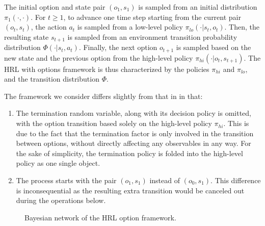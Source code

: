 The initial option and state pair $(o_1, s_1)$ is sampled from an initial distribution $\pi_1( \cdot, \cdot )$.
For $t \geq 1$, to advance one time step starting from the current pair $(o_t, s_t)$, the action $a_t$ is sampled from a low-level policy $\pi_{lo}(\cdot\vert s_t,o_t)$.
Then, the resulting state $s_{t+1}$ is sampled from an environment transition probability distribution $\Phi(\cdot\vert s_t,a_t)$.
Finally, the next option $o_{t+1}$ is sampled based on the new state and the previous option from the high-level policy $\pi_{hi}(\cdot\vert o_t,s_{t+1})$.
The HRL with options framework is thus characterized by the policies $\pi_{hi}$ and $\pi_{lo}$, and the transition distribution $\Phi$.

\begin{remark}
The framework we consider differs slightly from that in \cite{SUTTON1999181} in that:
\begin{enumerate}
    \item The termination random variable, along with its decision policy is omitted, with the option transition based solely on the high-level policy $\pi_{hi}$. This is due to the fact that the termination factor is only involved in the transition between options, without directly affecting any observables in any way. For the sake of simplicity, the termination policy is folded into the high-level policy as one single object.
    \item The process starts with the pair $(o_1, s_1)$ instead of $(o_0, s_1)$. This difference is inconsequential as the resulting extra transition would be canceled out during the operations below.
\end{enumerate}
\end{remark}
\begin{figure}
    \newcommand{\numnodes}{4}
    \centering
    \caption{Bayesian network of the HRL option framework.}
    \label{fig:Bayes_net}
\end{figure}

